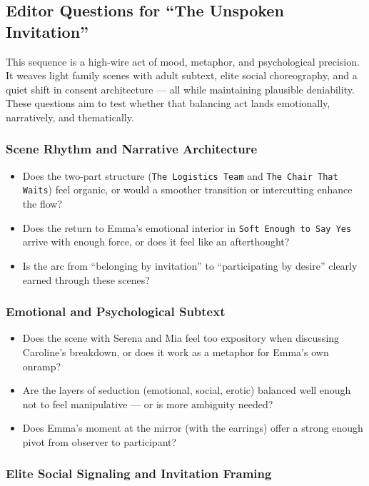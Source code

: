 \subsection*{Editor Questions for ``The Unspoken Invitation''}

This sequence is a high-wire act of mood, metaphor, and psychological precision. It weaves light family scenes with adult subtext, elite social choreography, and a quiet shift in consent architecture — all while maintaining plausible deniability. These questions aim to test whether that balancing act lands emotionally, narratively, and thematically.

\subsubsection*{Scene Rhythm and Narrative Architecture}

\begin{itemize}
  \item Does the two-part structure (\texttt{The Logistics Team} and \texttt{The Chair That Waits}) feel organic, or would a smoother transition or intercutting enhance the flow?
  \item Does the return to Emma’s emotional interior in \texttt{Soft Enough to Say Yes} arrive with enough force, or does it feel like an afterthought?
  \item Is the arc from “belonging by invitation” to “participating by desire” clearly earned through these scenes?
\end{itemize}

\subsubsection*{Emotional and Psychological Subtext}

\begin{itemize}
  \item Does the scene with Serena and Mia feel too expository when discussing Caroline's breakdown, or does it work as a metaphor for Emma’s own onramp?
  \item Are the layers of seduction (emotional, social, erotic) balanced well enough not to feel manipulative — or is more ambiguity needed?
  \item Does Emma’s moment at the mirror (with the earrings) offer a strong enough pivot from observer to participant?
\end{itemize}

\subsubsection*{Elite Social Signaling and Invitation Framing}

